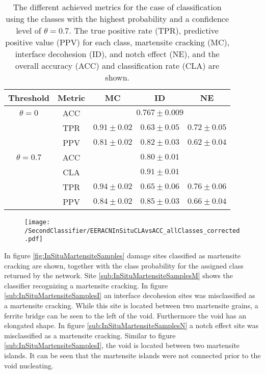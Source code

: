\begin{table}[H]
 \begin{center}
  \begin{tabular}{@{} *5c @{}} \toprule[2pt]
   Threshold & Metric &  MC & ID & NE \\ \midrule
   $\theta=0$ & ACC & \multicolumn{3}{c}{$0.767\pm0.009$} \\
   &TPR  & $0.91\pm 0.02$ & $0.63 \pm 0.05 $ & $0.72\pm 0.05$ \\
   &PPV  & $0.81\pm 0.02$ & $0.82\pm 0.03$ & $0.62\pm 0.04$ \\ \midrule
   $\theta=0.7$ & ACC & \multicolumn{3}{c}{ $0.80\pm0.01$} \\
   &CLA  & \multicolumn{3}{c}{ $0.91\pm 0.01$} \\ 
   &TPR  & $0.94\pm 0.02$ & $0.65 \pm 0.06$ & $0.76\pm 0.06$  \\
   &PPV  & $0.84 \pm 0.02$ & $0.85 \pm 0.03$ & $0.66 \pm 0.04$  \\   \bottomrule[2pt]
  \end{tabular}
 \end{center}
 \caption{The different achieved metrics for the case of classification using the classes with the highest probability and a confidence level of $\theta =0.7$. The true positive rate (TPR), predictive positive value (PPV) for each class, martensite cracking (MC), interface decohesion (ID), and notch effect (NE), and the overall accuracy (ACC) and classification rate (CLA) are shown.}
   \label{tab:SecondClassifierMetrics}
\end{table}



\begin{figure}
\centering
\texttt{[image: /SecondClassifier/EERACNInSituCLAvsACC\_allClasses\_corrected.pdf]}
\caption{}
\label{fig:SecondClassifierOverallAllClasses}
\end{figure}

In figure \ref{fig:InSituMartensiteSamples} damage sites classified as martensite cracking are shown, together with the class probability for the assigned class returned by the network. Site \ref{sub:InSituMartensiteSamplesM} shows the classifier recognizing a martensite cracking. In figure \ref{sub:InSituMartensiteSamplesI} an interface decohesion sites was misclassified as a martensite cracking. While this site is located between two martensite grains, a ferrite bridge can be seen to the left of the void. Furthermore the void has an elongated shape. In figure \ref{sub:InSituMartensiteSamplesN} a notch effect site was misclassified as a martensite cracking. Similar to figure \ref{sub:InSituMartensiteSamplesI}, the void is located between two martensite islands. It can be seen that the martensite islands were not connected prior to the void nucleating.

